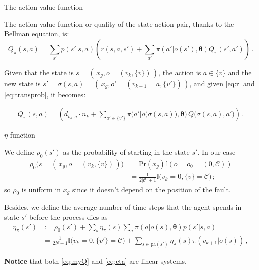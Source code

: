 \documentclass[10pt, aspectratio=169, compress, protectframetitle, handout]{beamer}
\begin{document}
\begin{frame}{The action value function}
    
    The \alert{action value function} or \alert{quality} of the state-action pair, thanks to the Bellman equation, is:
    \begin{equation}
        Q_\pi(s,a) = \sum_{s'} p(s' | s,a) \left(r(s,a,s') + \sum_{a'} \pi(a'|o(s'), \boldsymbol \theta) Q_\pi(s',a') \right) \, .
        \label{eq:Q}
    \end{equation}
    
    Given that the state is $s = ( \, x_g, o = (v_k, \{v\}) \, )$, the action is $a \in \{v\}$ and the new state is $s' = \sigma(s,a) = ( \, x_g, o' = (v_{k+1}=a, \{v'\}) \, )$, and given {\color{blue} \eqref{eq:r}} and {\color{blue} \eqref{eq:transprob}}, it becomes:

    \begin{equation}
        \begin{aligned}
            Q_\pi(s,a) = \left(d_{v_k, a} \cdot n_{k} + \sum_{a' \in \{v'\}} \pi \Big( a' \big| o \big( \sigma(s,a) \big), \boldsymbol \theta \Big) \, Q \big( \sigma(s,a), a' \big) \right) \,.
        \end{aligned}
        \label{eq:myQ}
    \end{equation}
    
\end{frame}

\begin{frame}{$\eta$ function}

    We define $\rho_0(s')$ as the probability of starting in the state $s'$. In our case
    \begin{equation}
        \begin{aligned}
            \rho_0 \Big(s = ( \, x_g, o =(v_k, \{v\}) \,) \Big)
            &= \text{Pr}(x_g) \mathbb I(o = o_0 = (0, \mathcal C)) \\
            &= \frac1{2|\mathcal C| + 1} \mathbb I \big( v_k=0, \{v\} = \mathcal C \big) \, ;
        \end{aligned}
        \label{eq:rho}
    \end{equation}
    so $\rho_0$ is uniform in $x_g$ since it doesn't depend on the position of the fault.
    
    Besides, we define the average number of time steps that the agent spends in state $s'$ before the process dies as
    \begin{equation}
        \begin{aligned}
            \eta_\pi(s') &:= \rho_0(s') + \sum_s \eta_\pi(s) \sum_a \pi(a | o(s), \boldsymbol \theta) p(s' | s, a) \\
            &= \frac{1}{2N+1} \mathbb I \big( v_k = 0, \{v'\} = \mathcal C \big) + \sum_{s \in \mathrm{pa}(s')} \eta_\pi(s) \pi(v_{k+1} | o(s)) \, ,
        \end{aligned}
        \label{eq:eta}
    \end{equation}
    
    \textbf{Notice} that both {\color{blue}\eqref{eq:myQ}} and {\color{blue}\eqref{eq:eta}} are \alert{linear systems}.

\end{frame}
\end{document}
